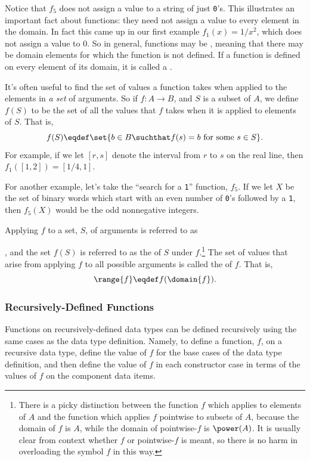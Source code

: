 Notice that $f_5$ does not assign a value to a string of just \texttt{0}'s.
This illustrates an important fact about functions: they need not assign a
value to every element in the domain.  In fact this came up in our first
example $f_1(x)=1/x^2$, which does not assign a value to $0$.  So in
general, functions may be , meaning that there may be domain
elements for which the function is not defined.  If a function is defined
on every element of its domain, it is called a .

It's often useful to find the set of values a function takes when applied
to the elements in \emph{a set} of arguments.  So if $f:A \to B$, and $S$
is a subset of $A$, we define $f(S)$ to be the set of all the values that
$f$ takes when it is applied to elements of $S$.  That is,
\[
f(S) \eqdef \set{b \in B \suchthat f(s) = b \text{ for some } s
  \in S}.
\]
For example, if we let $[r,s]$ denote the interval from $r$ to $s$ on the
real line, then $f_1([1,2]) = [1/4,1]$.

For another example, let's take the ``search for a \texttt{1}''
function, $f_5$.  If we let $X$ be the set of binary words which
start with an even number of \texttt{0}'s followed by a
\texttt{1}, then $f_5(X)$ would be the odd nonnegative integers.

Applying $f$ to a set, $S$, of arguments is referred to as
, and the
set $f(S)$ is referred to as the  of $S$ under
$f$.\footnote{There is a picky distinction between the function $f$ which
  applies to elements of $A$ and the function which applies $f$ pointwise
  to subsets of $A$, because the domain of $f$ is $A$, while the domain of
  pointwise-$f$ is $\power(A)$.  It is usually clear from context whether
  $f$ or pointwise-$f$ is meant, so there is no harm in overloading the
  symbol $f$ in this way.}  The set of values that arise from applying $f$
to all possible arguments is called the  of $f$.  That is,
\[
\range{f} \eqdef f(\domain{f}).
\]

\subsubsection{Recursively-Defined Functions}

Functions on recursively-defined data types can be defined recursively
using the same cases as the data type definition.  Namely, to define a
function, $f$, on a recursive data type, define the value of $f$ for the
base cases of the data type definition, and then define the value of $f$
in each constructor case in terms of the values of $f$ on the component
data items.

